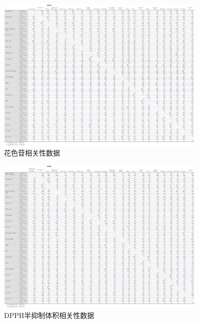 \documentclass[UTF8]{ctexart}
\begin{document}


\begin{figure}[H]\centering
	\includegraphics[width=0.9\textwidth]{img/Anthocyanin_correlation_data.png} %
	\caption{花色苷相关性数据} %
	\label{fig:figure 1} %
\end{figure}

\begin{figure}[H]\centering
	\includegraphics[width=0.9\textwidth]{img/DPPH_semi_inhibitory_volume_correlation_data.png}
	\caption{DPPH半抑制体积相关性数据} %
	\label{fig:figure 2} %
\end{figure}
\end{document}
